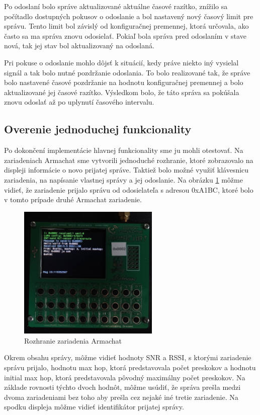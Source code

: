 \documentclass[slovak,master]{diploma}
\begin{document}
Po odoslaní bolo správe aktualizované aktuálne časové razítko, znížilo sa počítadlo dostupných pokusov o odoslanie a bol nastavený nový časový limit pre správu. Tento 
limit bol závislý od konfiguračnej premennej, ktorá určovala, ako často sa ma správa znovu odosielať. Pokiaľ bola správa pred odoslaním v stave nová, tak jej stav bol aktualizovaný 
na odoslaná.

Pri pokuse o odoslanie mohlo dôjsť k situácií, kedy práve niekto iný vysielal signál a tak bolo nutné pozdržanie odoslania. To bolo realizované tak, že správe bolo nastavené 
časové pozdržanie na hodnotu konfiguračnej premennej a bolo aktualizované jej časové razítko. Výsledkom bolo, že táto správa sa pokúšala znovu odoslať až po uplynutí 
časového intervalu.

\subsection{Overenie jednoduchej funkcionality}
Po dokončení implementácie hlavnej funkcionality sme ju mohli otestovať. Na zariadeniach Armachat sme vytvorili jednoduché rozhranie, 
ktoré zobrazovalo na displeji informácie o novo prijatej správe. Taktiež bolo možné využiť klávesnicu zariadenia, na napísanie vlastnej správy a jej odoslanie.
Na obrázku \ref{fig:armRec} môžme vidieť, že zariadenie prijalo správu od odosielateľa s adresou 0xA1BC, ktoré bolo v tomto prípade druhé Armachat zariadenie.
\begin{figure}[h!]
	\centering
	\includegraphics[width=0.6\textwidth]{Figures/armRec.jpg}
	\caption{Rozhranie zariadenia Armachat}
	\label{fig:armRec}
\end{figure}

Okrem obsahu správy, môžme vidieť hodnoty SNR a RSSI, s ktorými zariadenie správu prijalo, hodnotu max hop, ktorá predstavovala počet preskokov a hodnotu initial max hop, 
ktorá predstavovala pôvodný maximálny počet preskokov. Na základe rovnosti týchto dvoch hodnôt, môžme usúdiť, že správa prešla medzi dvoma zariadeniami bez toho aby prešla 
cez nejaké iné tretie zariadenie. Na spodku displeja môžme vidieť identifikátor prijatej správy.
\end{document}
